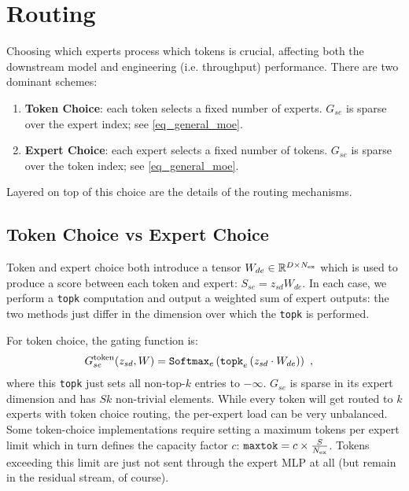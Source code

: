\section{Routing}


Choosing which experts process which tokens is crucial, affecting both the downstream model and
engineering (i.e. throughput) performance.  There are two dominant schemes:
\begin{enumerate}
    \item \textbf{Token Choice}: each token selects a fixed number of experts. $ G _{ se } $
         is sparse over the expert index; see \eqref{eq_general_moe}.
    \item \textbf{Expert Choice}: each expert selects a fixed number of tokens. $ G _{ se } $ is
        sparse over the token index; see \eqref{eq_general_moe}.
\end{enumerate}
Layered on top of this choice are the details of the routing mechanisms.

\subsection{Token Choice vs Expert Choice}

Token and expert choice both introduce a tensor $W _{ de } \in \mathbb{R} ^{ D\times N _{ {\rm  ex}
} }$ which is used to produce a score between each token and expert: $ S _{ se } = z _{ sd } W _{ de
} $. In each case, we perform a \texttt{topk} computation and output a weighted sum of expert
outputs: the two methods just differ in the dimension over which the \texttt{topk} is performed.

For token choice, the gating function is:
\begin{align}
    G  ^{ {\rm  token} }_{ se }(z _{ sd }, W)  &= \texttt{Softmax}_{ e } \left ( \texttt{topk} _{ e } \left ( z _{ sd } \cdot W _{ de }  \right ) \right ) \ , \label{eq_token_choice}
\end{align}
where this \texttt{topk} just sets all non-top-$ k $ entries to $ -\infty $. $ G _{ se } $
is sparse in its expert dimension and has $ Sk $ non-trivial elements. While every token will get
routed to $ k $ experts with token choice routing, the per-expert load can be very unbalanced. Some
token-choice implementations require setting a maximum tokens per expert limit which in turn defines
the capacity factor $ c $: $ \texttt{maxtok} = c \times \frac{ S }{ N _{ {\rm ex} } } $. Tokens
exceeding this limit are just not sent through the expert MLP at all (but remain in the residual
stream, of course).



